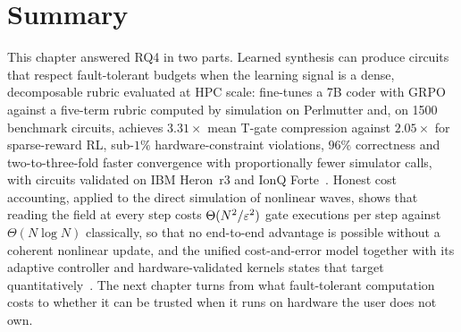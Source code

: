 \section{Summary}\label{sec:syn:summary}

This chapter answered RQ4 in two parts. Learned synthesis can produce circuits that respect fault-tolerant budgets when the learning signal is a dense, decomposable rubric evaluated at HPC scale: \rubriq{} fine-tunes a 7B coder with GRPO against a five-term rubric computed by \cudaq{} simulation on Perlmutter and, on \num{1500} benchmark circuits, achieves $3.31\times$ mean T-gate compression against $2.05\times$ for sparse-reward RL, sub-$1\%$ hardware-constraint violations, $96\%$ correctness and two-to-three-fold faster convergence with proportionally fewer simulator calls, with circuits validated on IBM Heron~r3 and IonQ Forte~\cite{guo2026rubriq}. Honest cost accounting, applied to the direct simulation of nonlinear waves, shows that reading the field at every step costs $\Theta(N^{2}/\varepsilon^{2})$ gate executions per step against $\Theta(N\log N)$ classically, so that no end-to-end advantage is possible without a coherent nonlinear update, and the unified cost-and-error model together with its adaptive controller and hardware-validated kernels states that target quantitatively~\cite{guo2026nonlinearwaves}. The next chapter turns from what fault-tolerant computation costs to whether it can be trusted when it runs on hardware the user does not own.
